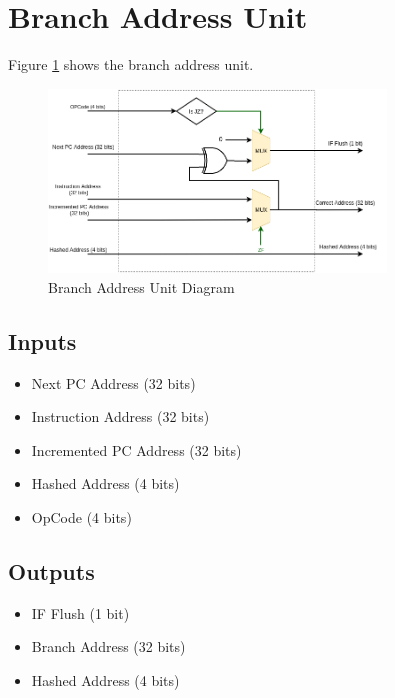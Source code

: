 \section{Branch Address Unit}
Figure \ref{fig:bau} shows the branch address unit.
\begin{center}
    \begin{figure}[hp]
        \centering
        \includegraphics[width=0.8\textwidth]{images/bau}
        \caption{Branch Address Unit Diagram}
        \label{fig:bau}
    \end{figure}
\end{center}

\subsection{Inputs}
\begin{itemize}
    \item Next PC Address (32 bits)
    \item Instruction Address (32 bits)
    \item Incremented PC Address (32 bits)
    \item Hashed Address (4 bits)
    \item OpCode (4 bits)
\end{itemize}

\subsection{Outputs}
\begin{itemize}
    \item IF Flush (1 bit)
    \item Branch Address (32 bits)
    \item Hashed Address (4 bits)
\end{itemize}

